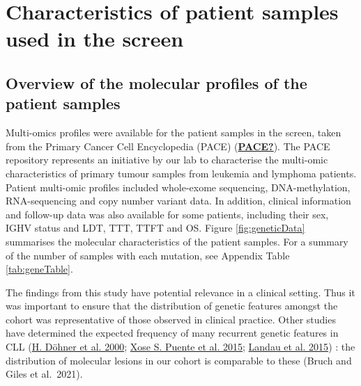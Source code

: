 \documentclass[11pt, a4paper, twosided]{book}
\begin{document}
\hypertarget{characteristics-of-patient-samples-used-in-the-screen}{%
\section{Characteristics of patient samples used in the screen}\label{characteristics-of-patient-samples-used-in-the-screen}}

\hypertarget{overview-of-the-molecular-profiles-of-the-patient-samples}{%
\subsection{Overview of the molecular profiles of the patient samples}\label{overview-of-the-molecular-profiles-of-the-patient-samples}}

Multi-omics profiles were available for the patient samples in the screen, taken from the Primary Cancer Cell Encyclopedia (PACE) (\protect\hyperlink{ref-PACE}{\textbf{PACE?}}). The PACE repository represents an initiative by our lab to characterise the multi-omic characteristics of primary tumour samples from leukemia and lymphoma patients. Patient multi-omic profiles included whole-exome sequencing, DNA-methylation, RNA-sequencing and copy number variant data. In addition, clinical information and follow-up data was also available for some patients, including their sex, IGHV status and LDT, TTT, TTFT and OS. Figure \ref{fig:geneticData} summarises the molecular characteristics of the patient samples. For a summary of the number of samples with each mutation, see Appendix Table \ref{tab:geneTable}.

The findings from this study have potential relevance in a clinical setting. Thus it was important to ensure that the distribution of genetic features amongst the cohort was representative of those observed in clinical practice. Other studies have determined the expected frequency of many recurrent genetic features in CLL (\protect\hyperlink{ref-Dohner2000}{H. Döhner et al. 2000}; \protect\hyperlink{ref-Puente2015}{Xose S. Puente et al. 2015}; \protect\hyperlink{ref-Landau2015}{Landau et al. 2015}) : the distribution of molecular lesions in our cohort is comparable to these (Bruch and Giles et al.~2021).
\end{document}

